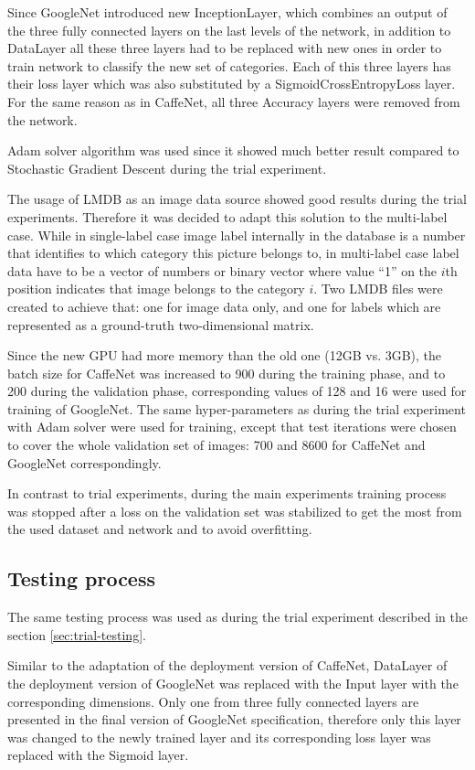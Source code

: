     Since GoogleNet introduced new InceptionLayer, which combines an output of the three fully connected layers on the last levels of the network, in addition to DataLayer all these three layers had to be replaced with new ones in order to train network to classify the new set of categories. Each of this three layers has their loss layer which was also substituted by a SigmoidCrossEntropyLoss layer. For the same reason as in CaffeNet, all three Accuracy layers were removed from the network.
    
    Adam solver algorithm was used since it showed much better result compared to Stochastic Gradient Descent during the trial experiment.

    The usage of LMDB as an image data source showed good results during the trial experiments. Therefore it was decided to adapt this solution to the multi-label case. While in single-label case image label internally in the database is a number that identifies to which category this picture belongs to, in multi-label case label data have to be a vector of numbers or binary vector where value ``1'' on the $i$th position indicates that image belongs to the category $i$. Two LMDB files were created to achieve that: one for image data only, and one for labels which are represented as a ground-truth two-dimensional matrix.  
    
    Since the new GPU had more memory than the old one (12GB vs. 3GB), the batch size for CaffeNet was increased to 900 during the training phase, and to 200 during the validation phase, corresponding values of 128 and 16 were used for training of GoogleNet. The same hyper-parameters as during the trial experiment with Adam solver were used for training, except that test iterations were chosen to cover the whole validation set of images: 700 and 8600 for CaffeNet and GoogleNet correspondingly.
    
    In contrast to trial experiments, during the main experiments training process was stopped after a loss on the validation set was stabilized to get the most from the used dataset and network and to avoid overfitting.

    \subsection{Testing process}
    The same testing process was used as during the trial experiment described in the section \ref{sec:trial-testing}.
    
    Similar to the adaptation of the deployment version of CaffeNet, DataLayer of the deployment version of GoogleNet was replaced with the Input layer with the corresponding dimensions. Only one from three fully connected layers are presented in the final version of GoogleNet specification, therefore only this layer was changed to the newly trained layer and its corresponding loss layer was replaced with the Sigmoid layer.
    
